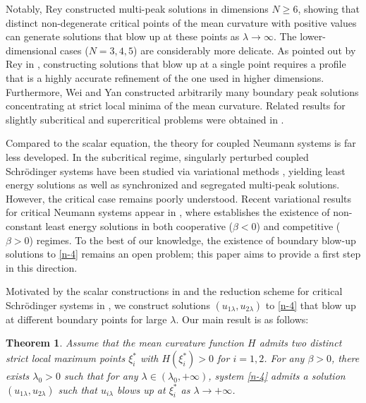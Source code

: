 \documentclass[a4paper,reqno,11pt,oneside]{amsart}
\numberwithin{equation}{section}
\newtheorem{Thm}{Theorem}[section]
\begin{document}
Notably, Rey \cite{Rey1997} constructed multi-peak solutions in dimensions $N\geq 6$, showing that  distinct non-degenerate critical points of the mean curvature with positive values can generate solutions that blow up at these points as $\lambda \to \infty$. The lower-dimensional cases ($N=3,4,5$) are considerably more delicate. As pointed out by Rey in \cite{1999-REY}, constructing solutions that blow up at a single point requires a profile that is a highly accurate refinement of the one used in higher dimensions. Furthermore, Wei and Yan \cite{Wei-Yan} constructed arbitrarily many boundary peak solutions concentrating at strict local minima of the mean curvature. Related results for slightly subcritical and supercritical problems were obtained in \cite{wei-rey-2005-34,wei-rey-2005,dmp}.

Compared to the scalar equation, the theory for coupled Neumann systems is far less developed. In the subcritical regime, singularly perturbed coupled Schrödinger systems have been studied via variational methods \cite{tang-201-jmaa,Tan-syn,tang-segre}, yielding least energy solutions as well as synchronized and segregated multi-peak solutions. However, the critical case remains poorly understood. Recent variational results for critical Neumann systems appear in \cite{yang-jf,arxiv-2025}, where \cite{arxiv-2025} establishes the existence of non-constant least energy solutions in both cooperative ($\beta < 0$) and competitive ($\beta > 0$) regimes. To the best of our knowledge, the existence of boundary blow-up solutions to \eqref{n-4} remains an open problem; this paper aims to provide a first step in this direction.

Motivated by the scalar constructions in \cite{1999-REY, Wei-Yan} and the reduction scheme for critical Schrödinger systems in \cite{Pistoia2017}, we construct solutions $(u_{1\lambda}, u_{2\lambda})$ to \eqref{n-4} that blow up at different boundary points for large $\lambda$. Our main result is as follows:

\begin{Thm}\label{xthmy}
Assume that the mean curvature function $H$ admits two distinct strict local maximum points $\xi_i^*$ with $H(\xi_i^*)>0$ for $i=1,2$. For any $\beta>0$, there exists $\lambda_0>0$ such that for any $\lambda \in (\lambda_0, +\infty)$, system \eqref{n-4} admits a solution $(u_{1\lambda}, u_{2\lambda})$ such that $u_{i\lambda}$ blows up at $\xi_i^*$ as $\lambda \to +\infty$.
\end{Thm}
\end{document}
